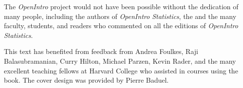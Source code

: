 The \emph{OpenIntro} project would not have been possible without the dedication of many people, including the authors of \textit{OpenIntro Statistics}, the 
 and the many faculty, students, and readers who commented on all the editions of \textit{OpenIntro Statistics}.

This text has benefited from feedback from Andrea Foulkes, Raji Balasubramanian, Curry Hilton, Michael Parzen, Kevin Rader, and the many excellent teaching fellows at Harvard College who assisted in courses using the book.  The cover design was provided by Pierre Baduel.


